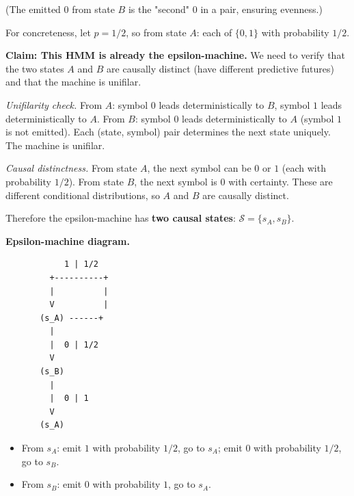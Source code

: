 (The emitted $0$ from state $B$ is the "second" $0$ in a pair, ensuring evenness.)

For concreteness, let $p = 1/2$, so from state $A$: each of $\{ 0, 1\} $ with probability $1/2$.

\textbf{Claim: This HMM is already the epsilon-machine.} We need to verify that the two states $A$ and $B$ are causally distinct (have different predictive futures) and that the machine is unifilar.

\textit{Unifilarity check.} From $A$: symbol $0$ leads deterministically to $B$, symbol $1$ leads deterministically to $A$. From $B$: symbol $0$ leads deterministically to $A$ (symbol $1$ is not emitted). Each (state, symbol) pair determines the next state uniquely. The machine is unifilar.

\textit{Causal distinctness.} From state $A$, the next symbol can be $0$ or $1$ (each with probability $1/2$). From state $B$, the next symbol is $0$ with certainty. These are different conditional distributions, so $A$ and $B$ are causally distinct.

Therefore the epsilon-machine has \textbf{two causal states}: $\mathcal{S} = \{ s_A, s_B\} $.

\textbf{Epsilon-machine diagram.}

\begin{verbatim}
            1 | 1/2
         +----------+
         |          |
         V          |
       (s_A) ------+
         |
         |  0 | 1/2
         V
       (s_B)
         |
         |  0 | 1
         V
       (s_A)
\end{verbatim}

\begin{itemize}
\item From $s_A$: emit $1$ with probability $1/2$, go to $s_A$; emit $0$ with probability $1/2$, go to $s_B$.
\item From $s_B$: emit $0$ with probability $1$, go to $s_A$.
\end{itemize}

